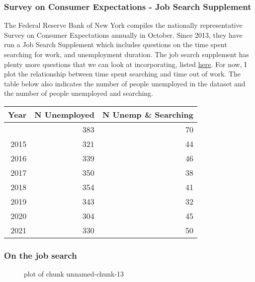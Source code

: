 \subsubsection{Survey on Consumer Expectations - Job Search
Supplement}\label{survey-on-consumer-expectations---job-search-supplement}

The Federal Reserve Bank of New York compiles the nationally
representative Survey on Consumer Expectations annually in October.
Since 2013, they have run a Job Search Supplement which includes
questions on the time spent searching for work, and unemployment
duration. The job search supplement has plenty more questions that we
can look at incorporating, listed
\href{https://www.newyorkfed.org/medialibrary/Interactives/sce/sce/downloads/data/SCE-Labor-Market-Survey-Data-Codebook.pdf?sc_lang=en}{here}.
For now, I plot the relationship between time spent searching and time
out of work. The table below also indicates the number of people
unemployed in the dataset and the number of people unemployed and
searching.

\begin{longtable}[]{@{}rrr@{}}
\toprule\noalign{}
Year & N Unemployed & N Unemp \& Searching \\
\midrule\noalign{}
\endhead
\bottomrule\noalign{}
\endlastfoot
2014 & 383 & 70 \\
2015 & 321 & 44 \\
2016 & 339 & 46 \\
2017 & 350 & 38 \\
2018 & 354 & 41 \\
2019 & 343 & 32 \\
2020 & 304 & 45 \\
2021 & 330 & 50 \\
\end{longtable}


\subsubsection{On the job search}\label{on-the-job-search}

\begin{figure}
\centering
{}
\caption{plot of chunk unnamed-chunk-13}
\end{figure}

